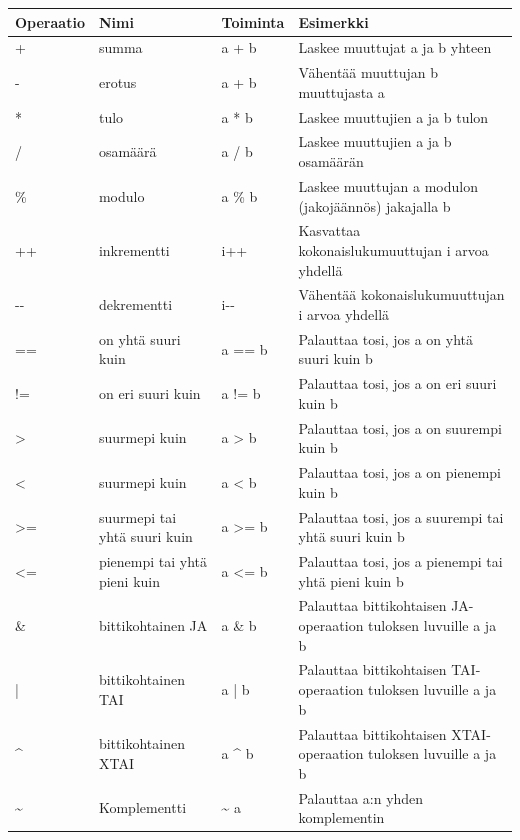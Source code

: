 \documentclass{tufte-book}
\begin{document}
\bigskip
\begin{center}
\footnotesize
\begin{tabular}{llll}
\toprule
Operaatio & Nimi & Toiminta & Esimerkki \\
\midrule
+ & summa & a + b & Laskee muuttujat a ja b yhteen \\
\addlinespace
- & erotus & a + b & Vähentää muuttujan b muuttujasta a \\
\addlinespace
* & tulo & a * b & Laskee muuttujien a ja b tulon \\
\addlinespace
/ & osamäärä & a / b & Laskee muuttujien a ja b osamäärän \\
\addlinespace
\% & modulo & a \% b & Laskee muuttujan a modulon (jakojäännös) jakajalla b \\
\addlinespace
++ & inkrementti & i++ & Kasvattaa kokonaislukumuuttujan i arvoa yhdellä \\
\addlinespace
-{}- & dekrementti & i-{}- & Vähentää kokonaislukumuuttujan i arvoa yhdellä \\
\addlinespace
== & on yhtä suuri kuin & a == b & Palauttaa tosi, jos a on yhtä suuri kuin b \\
\addlinespace
!= & on eri suuri kuin & a != b & Palauttaa tosi, jos a on eri suuri kuin b \\
\addlinespace
> & suurmepi kuin & a > b & Palauttaa tosi, jos a on suurempi kuin b \\
\addlinespace
< & suurmepi kuin & a < b & Palauttaa tosi, jos a on pienempi kuin b \\
\addlinespace
>= & suurmepi tai yhtä suuri kuin & a >= b & Palauttaa tosi, jos a suurempi tai yhtä
suuri kuin b \\
<= & pienempi tai yhtä pieni kuin & a <= b & Palauttaa tosi, jos a pienempi tai yhtä
pieni kuin b \\
\addlinespace
\& & bittikohtainen JA & a \& b & Palauttaa bittikohtaisen JA-operaation tuloksen luvuille a ja b
\\
\addlinespace
| & bittikohtainen TAI & a | b & Palauttaa bittikohtaisen TAI-operaation tuloksen luvuille a ja b
\\
\addlinespace
\^{} & bittikohtainen XTAI & a \^{} b & Palauttaa bittikohtaisen XTAI-operaation tuloksen luvuille
a ja b \\
\addlinespace
\~{} & Komplementti & \~{} a & Palauttaa a:n yhden komplementin \\
\bottomrule
\end{tabular}
\end{center}
\end{document}
